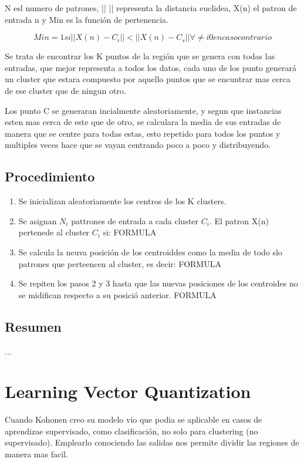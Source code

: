 \documentclass[12pt, twoside, openright]{report} %
\begin{document}
	N esl numero de patrones, || || representa la distancia euclidea, X(n) el patron de entrada n y Min es la función de pertenencia.
	
	$$Min = 1 si ||X(n) - C_i|| < || X(n) - C_s || \forall \neq i   0 en caso contrario$$

Se trata de encontrar los K puntos de la región que se genera con todas las entradas, que mejor representa a todos los datos, cada uno de los punto generará un cluster que estara compuesto por aquello puntos que se encuntrar mas cerca de ese cluster que de ningun otro.

Los punto C se generaran incialmente aleatoriamente, y segun que instancias esten mas cerca de este que de otro, se calculara la media de sus entradas de manera que se centre para todas estas, esto repetido para todos los puntos y multiples veces hace que se vayan centrando poco a poco y distribuyendo.

\subsection{Procedimiento}
\begin{enumerate}
	\item Se inicializan aleatoriamente los centros de los K clusters.
	\item Se asignan $N_i$ pattrones de entrada a cada cluster $C_i$. El patron X(n) pertenede al cluster $C_i$ si: FORMULA
	\item Se calcula la neuva posición de los centroiddes como la media de todo slo patrones que perteencen al cluster, es decir: FORMULA
	\item Se repiten los pasos 2 y 3 hasta que las nuevas posiciones de los centroides no se midifican respecto a su posició anterior.
		FORMULA
	\end{enumerate}
	
\subsection{Resumen}
...

\section{Learning Vector Quantization}
Cuando Kohonen creo su modelo vio que podia se aplicable en casos de aprendizae supervisado, como clasificación, no solo para clustering (no supervisado). Emplearlo conociendo las salidas nos permite dividir las regiones de manera mas facil.
\end{document}

